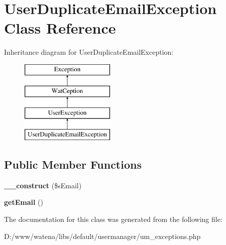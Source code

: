 \hypertarget{class_user_duplicate_email_exception}{\section{User\-Duplicate\-Email\-Exception Class Reference}
\label{class_user_duplicate_email_exception}
}
Inheritance diagram for User\-Duplicate\-Email\-Exception\-:\begin{figure}[H]
\begin{center}
\leavevmode
\includegraphics[height=4.000000cm]{class_user_duplicate_email_exception}
\end{center}
\end{figure}
\subsection*{Public Member Functions}
\begin{DoxyCompactItemize}
\item 
\hypertarget{class_user_duplicate_email_exception_a2624a70eee6e377fcf426f272d85ca77}{{\bfseries \-\_\-\-\_\-construct} (\$s\-Email)}\label{class_user_duplicate_email_exception_a2624a70eee6e377fcf426f272d85ca77}

\item 
\hypertarget{class_user_duplicate_email_exception_a12365105a8d912b96524d4482e2531d1}{{\bfseries get\-Email} ()}\label{class_user_duplicate_email_exception_a12365105a8d912b96524d4482e2531d1}

\end{DoxyCompactItemize}


The documentation for this class was generated from the following file\-:\begin{DoxyCompactItemize}
\item 
D\-:/www/watena/libs/default/usermanager/um\-\_\-exceptions.\-php\end{DoxyCompactItemize}
